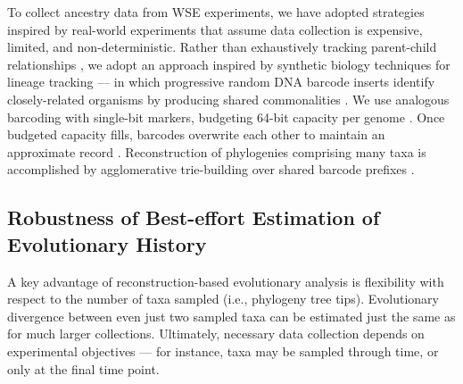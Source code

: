 
To collect ancestry data from WSE experiments, we have adopted strategies inspired by real-world experiments that assume data collection is expensive, limited, and non-deterministic.
Rather than exhaustively tracking parent-child relationships \cite{dolson2023phylotrackpy}, we adopt an approach inspired by synthetic biology techniques for lineage tracking \cite{moreno2022hereditary} --- in which progressive random DNA barcode inserts identify closely-related organisms by producing shared commonalities \cite{Masuyama2019}.
We use analogous barcoding with single-bit markers, budgeting 64-bit capacity per genome \cite{moreno2025testing}.
Once budgeted capacity fills, barcodes overwrite each other to maintain an approximate record \cite{moreno2024algorithms}.
Reconstruction of phylogenies comprising many taxa is accomplished by agglomerative trie-building over shared barcode prefixes \cite{moreno2023toward}.

\subsection{Robustness of Best-effort Estimation of Evolutionary History}
\label{moreno:sec:case2:missing}

A key advantage of reconstruction-based evolutionary analysis is flexibility with respect to the number of taxa sampled (i.e., phylogeny tree tips).
Evolutionary divergence between even just two sampled taxa can be estimated just the same as for much larger collections.
Ultimately, necessary data collection depends on experimental objectives --- for instance, taxa may be sampled through time, or only at the final time point.

